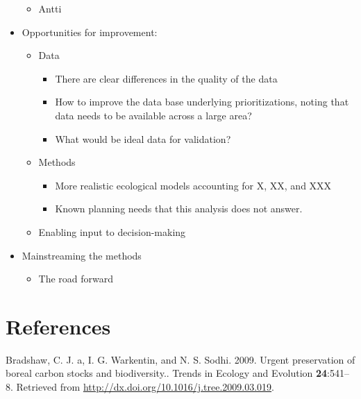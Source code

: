 \documentclass[]{article}
\begin{document}
\begin{itemize}
  \begin{itemize}
  \itemsep1pt\parskip0pt
  \item
    Antti
  \end{itemize}
\item
  Opportunities for improvement:

  \begin{itemize}
  \itemsep1pt\parskip0pt
  \item
    Data

    \begin{itemize}
    \itemsep1pt\parskip0pt
    \item
      There are clear differences in the quality of the data
    \item
      How to improve the data base underlying prioritizations, noting
      that data needs to be available across a large area?
    \item
      What would be ideal data for validation?
    \end{itemize}
  \item
    Methods

    \begin{itemize}
    \itemsep1pt\parskip0pt
    \item
      More realistic ecological models accounting for X, XX, and XXX
    \item
      Known planning needs that this analysis does not answer.
    \end{itemize}
  \item
    Enabling input to decision-making
  \end{itemize}
\item
  Mainstreaming the methods

  \begin{itemize}
  \itemsep1pt\parskip0pt
  \item
    The road forward
  \end{itemize}
\end{itemize}

\section{References}

Bradshaw, C. J. a, I. G. Warkentin, and N. S. Sodhi. 2009. Urgent
preservation of boreal carbon stocks and biodiversity.. Trends in
Ecology and Evolution \textbf{24}:541--8. Retrieved from
\url{http://dx.doi.org/10.1016/j.tree.2009.03.019}.
\end{document}
